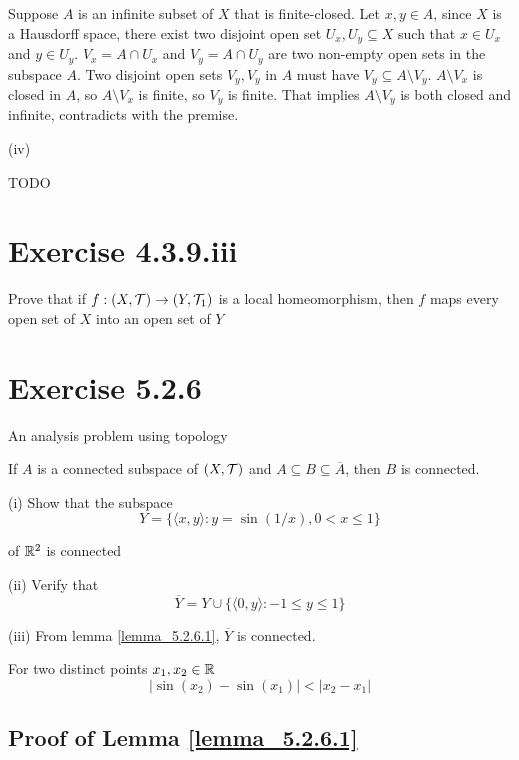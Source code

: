\documentclass{article}
\begin{document}
Suppose $A$ is an infinite subset of $X$ that is finite-closed. Let $x, y \in A$, since $X$ is a Hausdorff space, there exist two disjoint open set $U_x, U_y \subseteq X$ such that $x \in U_x$ and $y \in U_y$. $V_x = A \cap U_x$ and $V_y = A \cap U_y$ are two non-empty open sets in the subspace $A$. Two disjoint open sets $V_y, V_y$ in $A$ must have $V_y \subseteq A \setminus V_y$. $A \setminus V_x$ is closed in $A$, so $A \setminus V_x$ is finite, so $V_y$ is finite. That implies $A \setminus V_y$ is both closed and infinite, contradicts with the premise.

(iv)

TODO

\section*{Exercise 4.3.9.iii}

Prove that if $f: (X, \mathcal{T}) \to (Y, \mathcal{T}_1)$ is a local homeomorphism, then $f$ maps every open set of $X$ into an open set of $Y$


\section*{Exercise 5.2.6}

An analysis problem using topology

\begin{lemma}
    \label{lemma_5.2.6.1}
    If $A$ is a connected subspace of $(X, \mathcal{T})$ and $A \subseteq B \subseteq \overline{A}$, then $B$ is connected.
\end{lemma}

(i) Show that the subspace 
$$
    Y = \{ \langle x, y \rangle: y = \sin(1/x), 0 < x \leq 1\} 
$$

of $\mathbb{R}^2$ is connected

(ii) Verify that 
$$
    \overline{Y} = Y \cup \{ \langle 0, y \rangle: -1 \leq y \leq 1\}
$$

(iii) From lemma \ref{lemma_5.2.6.1}, $\overline{Y}$ is connected.

\begin{lemma}
\label{lemma_5.2.6.2}
For two distinct points $x_1, x_2 \in \mathbb{R}$
$$
    | \sin(x_2) - \sin(x_1) | < |x_2 - x_1|
$$
\end{lemma}

\subsection*{Proof of Lemma \ref{lemma_5.2.6.1}}
\end{document}
